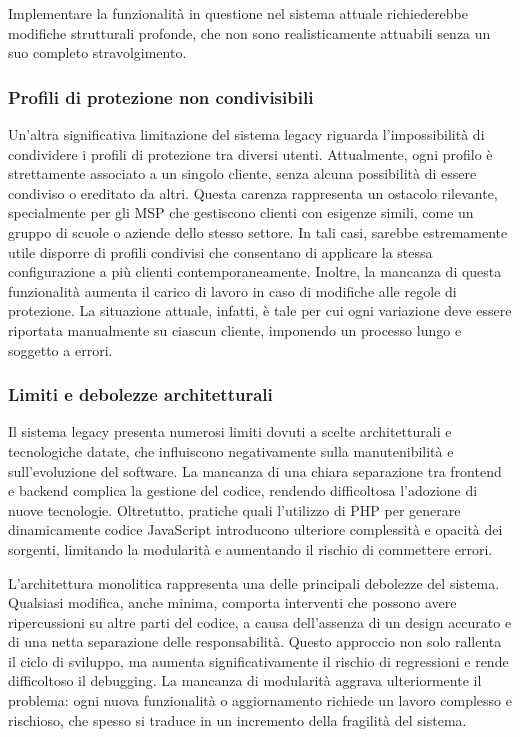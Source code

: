 Implementare la funzionalità in questione nel sistema attuale richiederebbe modifiche strutturali profonde, che non sono realisticamente attuabili senza un suo completo stravolgimento.

\subsubsection{Profili di protezione non condivisibili}
Un’altra significativa limitazione del sistema legacy riguarda l’impossibilità di condividere i profili di protezione tra diversi utenti. Attualmente, ogni profilo è strettamente associato a un singolo cliente, senza alcuna possibilità di essere condiviso o ereditato da altri. Questa carenza rappresenta un ostacolo rilevante, specialmente per gli MSP che gestiscono clienti con esigenze simili, come un gruppo di scuole o aziende dello stesso settore. In tali casi, sarebbe estremamente utile disporre di profili condivisi che consentano di applicare la stessa configurazione a più clienti contemporaneamente.
%
Inoltre, la mancanza di questa funzionalità aumenta il carico di lavoro in caso di modifiche alle regole di protezione. La situazione attuale, infatti, è tale per cui ogni variazione deve essere riportata manualmente su ciascun cliente, imponendo un processo lungo e soggetto a errori.

\subsubsection{Limiti e debolezze architetturali}
Il sistema legacy presenta numerosi limiti dovuti a scelte architetturali e tecnologiche datate, che influiscono negativamente sulla manutenibilità e sull'evoluzione del software. La mancanza di una chiara separazione tra frontend e backend complica la gestione del codice, rendendo difficoltosa l’adozione di nuove tecnologie. Oltretutto, pratiche quali l’utilizzo di PHP per generare dinamicamente codice JavaScript introducono ulteriore complessità e opacità dei sorgenti, limitando la modularità e aumentando il rischio di commettere errori.

L’architettura monolitica rappresenta una delle principali debolezze del sistema. Qualsiasi modifica, anche minima, comporta interventi che possono avere ripercussioni su altre parti del codice, a causa dell’assenza di un design accurato e di una netta separazione delle responsabilità. Questo approccio non solo rallenta il ciclo di sviluppo, ma aumenta significativamente il rischio di regressioni e rende difficoltoso il debugging. La mancanza di modularità aggrava ulteriormente il problema: ogni nuova funzionalità o aggiornamento richiede un lavoro complesso e rischioso, che spesso si traduce in un incremento della fragilità del sistema.

